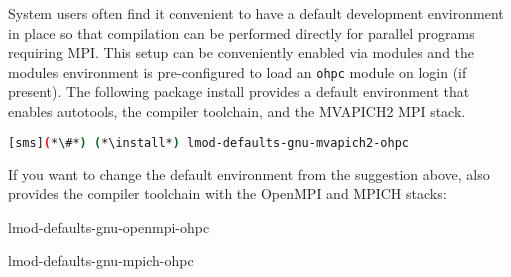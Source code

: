 System users often find it convenient to have a default development environment
in place so that compilation can be performed directly for parallel programs
requiring MPI. This setup can be conveniently enabled via modules and the \OHPC{}
modules environment is pre-configured to load an \texttt{ohpc} module on login
(if present). The following package install provides a default
environment that enables autotools, the \GNU{} compiler toolchain, and the
MVAPICH2 MPI stack.

\begin{lstlisting}[language=bash]
[sms](*\#*) (*\install*) lmod-defaults-gnu-mvapich2-ohpc
\end{lstlisting}

\begin{center}
\begin{tcolorbox}[]
\small
If you want to change the default environment from the suggestion above, \OHPC{}
also provides the \GNU{} compiler toolchain with the OpenMPI and MPICH stacks:
\begin{itemize*}
\item lmod-defaults-gnu-openmpi-ohpc
\item lmod-defaults-gnu-mpich-ohpc
\end{itemize*}
\end{tcolorbox}
\end{center}
